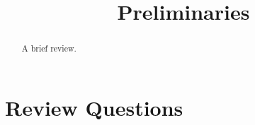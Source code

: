 \documentclass{ximera}
\title{Preliminaries}
\begin{document}
\begin{abstract}
A brief review.
\end{abstract}
\maketitle

\section*{Review Questions}
\end{document}
